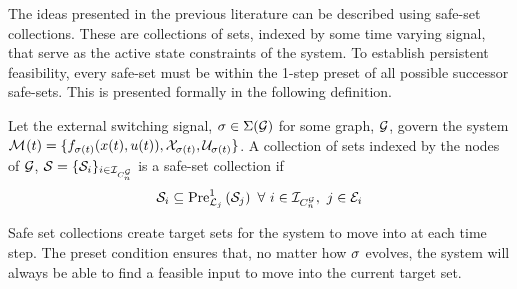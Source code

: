 The ideas presented in the previous literature can be described using safe-set collections. These are collections of sets, indexed by some time varying signal, that serve as the active state constraints of the system. To establish persistent feasibility, every safe-set must be within the 1-step preset of all possible successor safe-sets. This is presented formally in the following definition.
\begin{definition}
Let the external switching signal, $\ss\in\Sigma(\graph)$ for some graph, $\graph$, govern the system $\mode{}(t)=\{f_{\ss(t)}(x(t),u(t)),\xcon[\ss(t)],\ucon[\ss(t)]\}$. A collection of sets indexed by the nodes of $\graph$, $\mathcal{S}=\{\mathcal{S}_{i}\}_{i\in\idxset{\gnumnodes}}$ is a safe-set collection if
$$\mathcal{S}_{i}\subseteq\Pre[\gnodelabel{j}][1]{\mathcal{S}_{j}}\ \forall\ i\in\idxset{\gnumnodes},\ j\in \gnodeedges{i}$$
\end{definition}
Safe set collections create target sets for the system to move into at each time step. The preset condition ensures that, no matter how $\ss$ evolves, the system will always be able to find a feasible input to move into the current target set.
